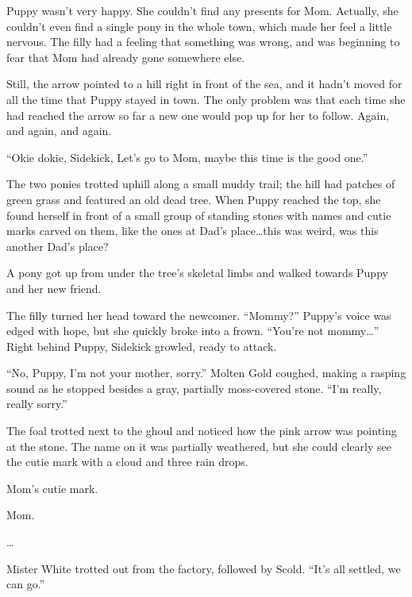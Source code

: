 \horizonline


Puppy wasn't very happy. She couldn't find any presents for Mom. Actually, she couldn't even find a single pony in the whole town, which made her feel a little nervous. The filly had a feeling that something was wrong, and was beginning to fear that Mom had already gone somewhere else.

Still, the arrow pointed to a hill right in front of the sea, and it hadn't moved for all the time that Puppy stayed in town. The only problem was that each time she had reached the arrow so far a new one would pop up for her to follow. Again, and again, and again.

``Okie dokie, Sidekick, Let's go to Mom, maybe this time is the good one.''

The two ponies trotted uphill along a small muddy trail; the hill had patches of green grass and featured an old dead tree. When Puppy reached the top, she found herself in front of a small group of standing stones with names and cutie marks carved on them, like the ones at Dad's place\dots this was weird, was this another Dad's place?

A pony got up from under the tree's skeletal limbs and walked towards Puppy and her new friend.

The filly turned her head toward the newcomer. ``Mommy?'' Puppy's voice was edged with hope, but she quickly broke into a frown. ``You're not mommy\dots'' Right behind Puppy, Sidekick growled, ready to attack.

``No, Puppy, I'm not your mother, sorry.'' Molten Gold coughed, making a rasping sound as he stopped besides a gray, partially moss-covered stone. ``I'm really, really sorry.''

The foal trotted next to the ghoul and noticed how the pink arrow was pointing at the stone. The name on it was partially weathered, but she could clearly see the cutie mark with a cloud and three rain drops.

Mom's cutie mark.

Mom.

\ldots{}

\horizonline


Mister White trotted out from the factory, followed by Scold. ``It's all settled, we can go.''

